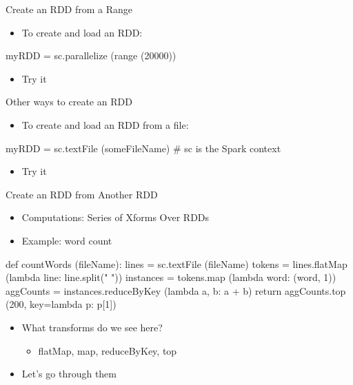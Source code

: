 \documentclass[aspectratio=169]{beamer}
\begin{document}
\begin{frame}[fragile]{Create an RDD from a Range}

\begin{itemize}
\item To create and load an RDD:
\end{itemize}

\begin{SQL}
myRDD = sc.parallelize (range (20000)) 
\end{SQL}

\begin{itemize}
\item Try it
\end{itemize}


\end{frame}

\begin{frame}[fragile]{Other ways to create an RDD}

\begin{itemize}
\item To create and load an RDD from a file:
\end{itemize}

\begin{SQL}
myRDD = sc.textFile (someFileName) # sc is the Spark context
\end{SQL}

\begin{itemize}
\item Try it
\end{itemize}


\end{frame}



\begin{frame}[fragile]{Create an RDD from Another RDD}

\begin{itemize}
\item Computations: Series of Xforms Over RDDs
\item Example: word count
\end{itemize}

\begin{SQL}
def countWords (fileName):
     lines = sc.textFile (fileName)
     tokens = lines.flatMap (lambda line: line.split(" "))
     instances = tokens.map (lambda word: (word, 1))
     aggCounts = instances.reduceByKey (lambda a, b: a + b)
     return aggCounts.top (200, key=lambda p: p[1])
\end{SQL}

\begin{itemize}
\item What transforms do we see here?
	\begin{itemize}
	\item flatMap, map, reduceByKey, top
	\end{itemize}
\item Let's go through them
\end{itemize}
\end{frame}
\end{document}
